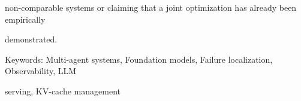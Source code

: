\begin{flushleft}
\noindent  non-comparable systems or claiming that a joint optimization has already been empirically\par
\noindent  demonstrated.\par
\par\smallskip
\noindent Keywords: Multi-agent systems, Foundation models, Failure localization, Observability, LLM\par
\noindent serving, KV-cache management\par
\par\smallskip
\par\smallskip
\par\smallskip
\end{flushleft}
